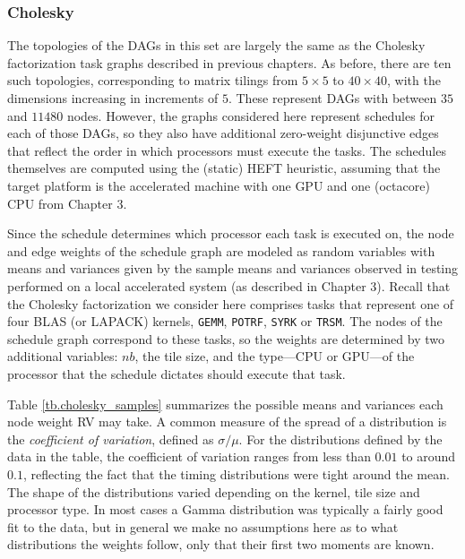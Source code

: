 \documentclass[12pt]{article}
\begin{document}
\subsubsection{Cholesky}
\label{subsubsect.cholesky}

The topologies of the DAGs in this set are largely the same as the Cholesky factorization task graphs described in previous chapters. As before, there are ten such topologies, corresponding to matrix tilings from $5 \times 5$ to $40 \times 40$, with the dimensions increasing in increments of $5$. These represent DAGs with between $35$ and $11480$ nodes. However, the graphs considered here represent schedules for each of those DAGs, so they also have additional zero-weight disjunctive edges that reflect the order in which processors must execute the tasks. The schedules themselves are computed using the (static) HEFT heuristic, assuming that the target platform is the accelerated machine with one GPU and one (octacore) CPU from Chapter 3.

Since the schedule determines which processor each task is executed on, the node and edge weights of the schedule graph are modeled as random variables with means and variances given by the sample means and variances observed in testing performed on a local accelerated system (as described in Chapter 3). Recall that the Cholesky factorization we consider here comprises tasks that represent one of four BLAS (or LAPACK) kernels, {\tt GEMM}, {\tt POTRF}, {\tt SYRK} or {\tt TRSM}. The nodes of the schedule graph correspond to these tasks, so the weights are determined by two additional variables: $nb$, the tile size, and the type---CPU or GPU---of the processor that the schedule dictates should execute that task.

Table \ref{tb.cholesky_samples} summarizes the possible means and variances each node weight RV may take. A common measure of the spread of a distribution is the {\em coefficient of variation}, defined as $\sigma / \mu$. For the distributions defined by the data in the table, the coefficient of variation ranges from less than $0.01$ to around $0.1$, reflecting the fact that the timing distributions were tight around the mean. The shape of the distributions varied depending on the kernel, tile size and processor type. In most cases a Gamma distribution was typically a fairly good fit to the data, but in general we make no assumptions here as to what distributions the weights follow, only that their first two moments are known.           
\end{document}
